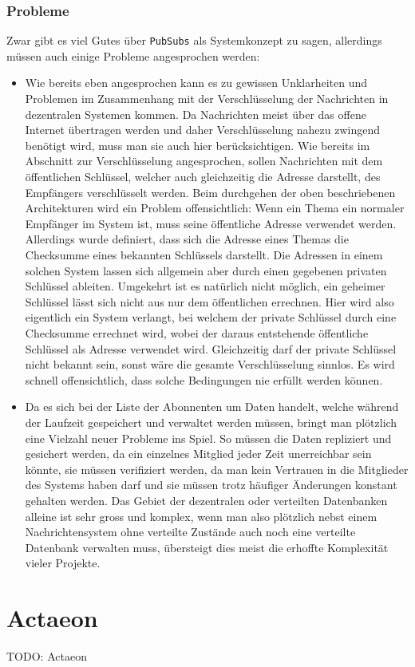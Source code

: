 \documentclass[11pt]{article}
\begin{document}
\subsubsection{Probleme}
\label{sec:orgae7d86b}
Zwar gibt es viel Gutes über \texttt{PubSubs} als Systemkonzept zu sagen,
allerdings müssen auch einige Probleme angesprochen werden:
\begin{itemize}
\item Wie bereits eben angesprochen kann es zu gewissen Unklarheiten und
Problemen im Zusammenhang mit der Verschlüsselung der Nachrichten in
dezentralen Systemen kommen. Da Nachrichten meist über das offene
Internet übertragen werden und daher Verschlüsselung nahezu zwingend
benötigt wird, muss man sie auch hier berücksichtigen. Wie bereits
im Abschnitt zur Verschlüsselung angesprochen, sollen Nachrichten
mit dem öffentlichen Schlüssel, welcher auch gleichzeitig die
Adresse darstellt, des Empfängers verschlüsselt werden. Beim
durchgehen der oben beschriebenen Architekturen wird ein Problem
offensichtlich: Wenn ein Thema ein normaler Empfänger im System ist,
muss seine öffentliche Adresse verwendet werden. Allerdings wurde
definiert, dass sich die Adresse eines Themas die Checksumme eines
bekannten Schlüssels darstellt. Die Adressen in einem solchen System
lassen sich allgemein aber durch einen gegebenen privaten Schlüssel
ableiten. Umgekehrt ist es natürlich nicht möglich, ein geheimer
Schlüssel lässt sich nicht aus nur dem öffentlichen errechnen. Hier
wird also eigentlich ein System verlangt, bei welchem der private
Schlüssel durch eine Checksumme errechnet wird, wobei der daraus
entstehende öffentliche Schlüssel als Adresse verwendet wird.
Gleichzeitig darf der private Schlüssel nicht bekannt sein, sonst
wäre die gesamte Verschlüsselung sinnlos. Es wird schnell
offensichtlich, dass solche Bedingungen nie erfüllt werden können.
\item Da es sich bei der Liste der Abonnenten um Daten handelt, welche
während der Laufzeit gespeichert und verwaltet werden müssen, bringt
man plötzlich eine Vielzahl neuer Probleme ins Spiel. So müssen die
Daten repliziert und gesichert werden, da ein einzelnes Mitglied
jeder Zeit unerreichbar sein könnte, sie müssen verifiziert werden,
da man kein Vertrauen in die Mitglieder des Systems haben darf und
sie müssen trotz häufiger Änderungen konstant gehalten werden. Das
Gebiet der dezentralen oder verteilten Datenbanken alleine ist sehr
gross und komplex, wenn man also plötzlich nebst einem
Nachrichtensystem ohne verteilte Zustände auch noch eine verteilte
Datenbank verwalten muss, übersteigt dies meist die erhoffte
Komplexität vieler Projekte.
\end{itemize}
\section{Actaeon}
\label{sec:org63d7834}
TODO: Actaeon
\end{document}
